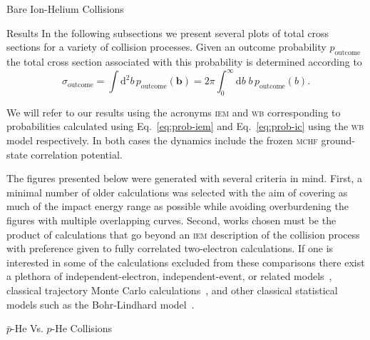\documentclass[a5paper, 9 pt]{extreport}
\begin{document}
\begin{chapter}{Bare Ion-Helium Collisions \label{chap:p-he2p-he}}
\begin{section}{Results \label{sec:phe2p-res}}
      In the following subsections we present several plots of total cross sections for a variety of
      collision processes. Given an outcome probability $p_\mathrm{outcome}$ the total cross section
      associated with this probability is determined according to
      \begin{equation} \label{eq:tcs}
         \sigma_\mathrm{outcome} = \int \mathrm{d}^2 b \, p_\mathrm{outcome} (\mathbf{b})
         = 2 \pi \int^\infty_0 \mathrm{d}b \; b \, p_\mathrm{outcome} (b).
      \end{equation}

      We will refer to our results using the acronyms \textsc{iem} and \textsc{wb} corresponding to
      probabilities calculated using Eq.~\eqref{eq:prob-iem} and Eq.~\eqref{eq:prob-ic} using the
      \textsc{wb} model respectively. In both cases the dynamics include the frozen \textsc{mchf}
      ground-state correlation potential.

      The figures presented below were generated with several criteria in mind. First, a minimal number
      of older calculations was selected with the aim of covering as much of the impact energy range as
      possible while avoiding overburdening the figures with multiple overlapping curves. Second, works
      chosen must be the product of calculations that go beyond an \textsc{iem} description of the
      collision process with preference given to fully correlated two-electron calculations. If one is
      interested in some of the calculations excluded from these comparisons there exist a plethora of
      independent-electron, independent-event, or related models~\cite{SLD-83, DMR-84, SLD-85, GM-86,
      CM-87, GM-87, JLF-89, DC-90, DC-91a, DC-91b, DG-91, SKG-91, SL-91, Kuang-92, MLC-93, CM-94,
      CSR-95, BDM-96, MBGH-97, McCartney-97, McCartney-99, GAMRF-02, GFS-02, AMRF-04, BLMC-04, FRBJG-06,
      FJG-07, GIFK-08, ZK-09, G-11, LFG-11, GG-12a}, classical trajectory Monte Carlo
      calculations~\cite{ZM-85, OWM-86, MO-87, WO-88, MS-89, Cohen-96, TH-96, MMTH-02, DAKW-04, GEP-09},
      and other classical statistical models such as the Bohr-Lindhard model~\cite{DYC-08,Ding-12}.

      \begin{subsection}{ \texorpdfstring{$\bar{p}$}{pbar}-He Vs. \texorpdfstring{$p$}{p}-He Collisions
                         \label{sec:pbarhe-res}}


\end{subsection}
\end{section}
\end{chapter}
\end{document}
